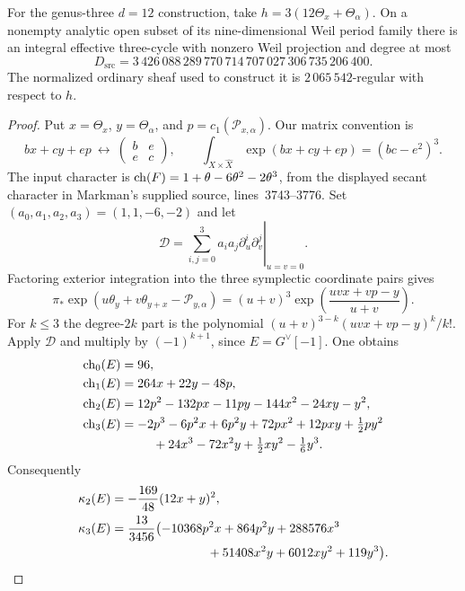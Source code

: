 \begin{proposition}\label{M9}
For the genus-three $d=12$ construction, take
$h=3(12\Theta_x+\Theta_\alpha)$. On a nonempty analytic open subset
of its nine-dimensional Weil period family there is an integral
effective three-cycle with nonzero Weil projection and degree at most
\begin{equation}\label{eq:M9Dsource}
 D_{\mathrm{src}}=
 3\,426\,088\,289\,770\,714\,707\,027\,306\,735\,206\,400.
\end{equation}
The normalized ordinary sheaf used to construct it is
$2\,065\,542$-regular with respect to $h$.
\end{proposition}
\begin{proof}
Put $x=\Theta_x$, $y=\Theta_\alpha$, and
$p=c_1(\mathcal P_{x,\alpha})$. Our matrix convention is
\[
 bx+cy+ep\ \longleftrightarrow\
 \begin{pmatrix}b&e\\e&c\end{pmatrix},\qquad
 \int_{X\times\widehat X}\exp(bx+cy+ep)=(bc-e^2)^3.
\]
The input character is
$\operatorname{ch}(F)=1+\theta-6\theta^2-2\theta^3$, from the displayed secant
character in Markman's supplied source, lines~3743--3776.
Set $(a_0,a_1,a_2,a_3)=(1,1,-6,-2)$ and let
\[
 \mathcal D=\left.
       \sum_{i,j=0}^3 a_i a_j\partial_u^i\partial_v^j
       \right|_{u=v=0}.
\]
Factoring exterior integration into the three symplectic coordinate
pairs gives
\[
 \pi_*\exp(u\theta_y+v\theta_{y+x}-\mathcal P_{y,\alpha})
 =(u+v)^3
       \exp\left(\frac{uvx+vp-y}{u+v}\right).
\]
For $k\le3$ the degree-$2k$ part is the polynomial
$(u+v)^{3-k}(uvx+vp-y)^k/k!$. Apply $\mathcal D$ and multiply
by $(-1)^{k+1}$, since $E=G^\vee[-1]$. One obtains
\begin{align*}
 \operatorname{ch}_0(E)&=96,\\
 \operatorname{ch}_1(E)&=264x+22y-48p,\\
 \operatorname{ch}_2(E)&=12p^2-132px-11py-144x^2-24xy-y^2,\\
 \operatorname{ch}_3(E)&=-2p^3-6p^2x+6p^2y+72px^2+12pxy+\tfrac12py^2\\
          &\hspace{9mm}+24x^3-72x^2y+\tfrac12xy^2-\tfrac16y^3.
\end{align*}
Consequently
\begin{align}
 \kappa_2(E)&=-\frac{169}{48}(12x+y)^2,\label{eq:M9kappa2}\\
 \kappa_3(E)&=\frac{13}{3456}
 \bigl(-10368p^2x+864p^2y+288576x^3\nonumber\\
 &\hspace{27mm}+51408x^2y+6012xy^2+119y^3\bigr).
 \label{eq:M9kappa3}
\end{align}


\end{proof}
